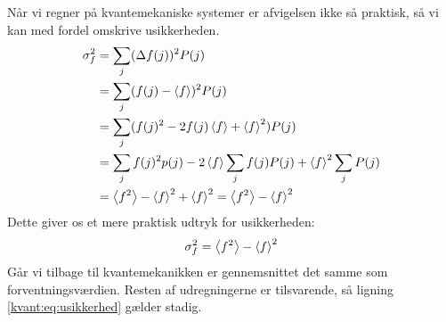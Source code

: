 \documentclass[../Kvantemekanik.tex]{subfiles}
\begin{document}
Når vi regner på kvantemekaniske systemer er afvigelsen ikke så praktisk, så vi kan med fordel omskrive usikkerheden.
\begin{align*}
    \sigma_f^2&=\sum_j(\Delta f(j))^2P(j)\\
    &= \sum_j(f(j)-\left< f \right>)^2P(j)\\
    &=\sum_j(f(j)^2-2f(j)\left< f \right>+\left< f \right>^2)P(j)\\
    &= \sum_jf(j)^2p(j)-2\left< f \right>\sum_jf(j)P(j)+\left< f \right>^2\sum_jP(j)\\
    &= \left< f^2 \right>-\left< f \right>^2+\left< f \right>^2 = \left< f^2 \right>-\left< f \right>^2
\end{align*}
Dette giver os et mere praktisk udtryk for usikkerheden:
\begin{equation}
    \sigma_f^2=\left< f^2 \right>-\left< f \right>^2
    \label{kvant:eq:usikkerhed}
\end{equation}
Går vi tilbage til kvantemekanikken er gennemsnittet det samme som forventningsværdien. Resten af udregningerne er tilsvarende, så ligning \eqref{kvant:eq:usikkerhed} gælder stadig.
\end{document}
